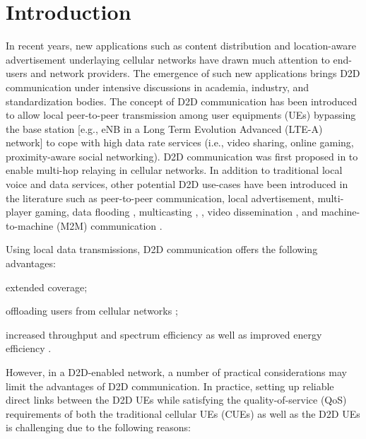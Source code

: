 \documentclass[twocolumn,10pt]{IEEEtran}
\begin{document}
\section{Introduction} \label{sec:intro}


In recent years, new applications such as content distribution and location-aware advertisement underlaying cellular networks have drawn much attention to end-users and network providers. The emergence of such new applications brings D2D communication under intensive discussions in  academia, industry, and standardization bodies. The concept of D2D communication has been introduced to allow local peer-to-peer transmission among user equipments (UEs) bypassing the base station [e.g., eNB in a Long Term Evolution Advanced (LTE-A) network] to cope with high data rate services (i.e., video sharing, online gaming, proximity-aware social networking). D2D communication was first
proposed in \cite{d2d_first_relay} to enable multi-hop relaying in cellular networks. In addition to traditional local voice and data services, other potential D2D use-cases have been introduced in the literature such as peer-to-peer communication, local advertisement, multi-player gaming, data flooding \cite{d2d_example, d2d_example2, 3gpp:d2d_example}, multicasting \cite{d2d_example_multicast}, \cite{d2d_multicast}, video dissemination \cite{d2d_example_video, d2d_example_video2, d2d_inceremental_relay}, and machine-to-machine (M2M) communication \cite{d2d_m2m_1}.

Using local data transmissions, D2D communication offers the following advantages: \begin{inparaenum}  
\item extended coverage;
\item offloading users from cellular networks \cite{d2d_example_offload};
\item increased throughput and spectrum efficiency as well as improved energy efficiency \cite{d2d_energy}.
\end{inparaenum}
However, in a D2D-enabled network, a number of practical considerations may limit the advantages of D2D communication. In practice, setting up reliable direct links between the D2D UEs while satisfying the quality-of-service (QoS) requirements of both the traditional cellular UEs (CUEs) as well as the  D2D UEs is challenging due to the following reasons:  
\end{document}
